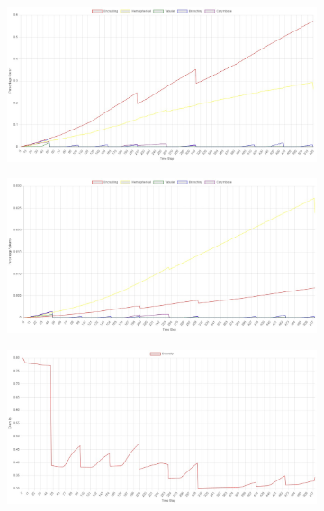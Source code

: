 \documentclass[9pt]{pnas-new}
\begin{document}
\begin{figure}[H]
    \centering
    \begin{subfigure}{0.35\textwidth}
        \includegraphics[width=\textwidth]{fig/moderate_chart_cover.jpg}
    \end{subfigure}
        \begin{subfigure}{0.35\textwidth}
        \includegraphics[width=\textwidth]{fig/moderate_chart_volume.jpg}
    \end{subfigure}
        \begin{subfigure}{0.35\textwidth}
        \includegraphics[width=\textwidth]{fig/moderate_chart_diversity.jpg}

\end{subfigure}
\end{figure}
\end{document}
